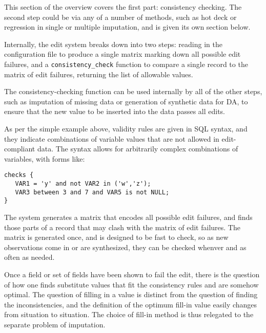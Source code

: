 \documentclass{article}
\begin{document}
This section of the overview covers the first part: consistency checking. 
The second step could be via any of a number of methods, such as hot deck or
regression in single or multiple imputation, and is given its own section below. 

Internally, the edit system breaks down into two steps: reading in the
configuration file to produce a single matrix marking down all possible edit
failures, and a {\tt consistency\_check} function to compare a single record to
the matrix of edit failures, returning the list of allowable values. 

The consistency-checking function can be used internally by all of the other steps, such as
imputation of missing data or generation of synthetic data for DA, to ensure
that the new value to be inserted into the data passes all edits. 


As per the simple example above, validity rules are given in SQL syntax, and they
indicate combinations of variable values that are not allowed in edit-compliant data. The
syntax allows for arbitrarily complex combinations of variables, with forms like:
\begin{lstlisting}
checks {
   VAR1 = 'y' and not VAR2 in ('w','z');
   VAR3 between 3 and 7 and VAR5 is not NULL;
}
\end{lstlisting}

The system generates a matrix that encodes all possible edit failures, and finds
those parts of a record that may clash with the matrix of edit failures. The matrix
is generated once, and is designed to be fast to check, so as new observations come
in or are synthesized, they can be checked whenver and as often as needed.

Once a field or set of fields have been shown to fail the edit, there is the question of
how one finds substitute values that fit the consistency rules and are somehow optimal.
The question of filling in a value is distinct from the  question of finding the
inconsistencies, and the definition of the optimum fill-in value easily changes from
situation to situation. The choice of fill-in method is thus relegated to the separate
problem of imputation.
\end{document}
